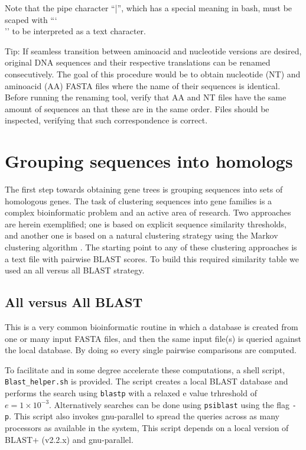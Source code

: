 \documentclass[10pt]{article}
\begin{document}
Note that the pipe character ``|'', which has a special meaning in
bash, must be scaped with ``\char`\\'' to be interpreted as a text character.

Tip: If seamless transition between aminoacid and nucleotide versions
are desired, original DNA sequences and their respective
translations can be renamed consecutively. The goal of this
procedure would be to obtain nucleotide (NT) and aminoacid (AA) FASTA
files where the name of their sequences is identical.  Before running
the renaming tool, verify that AA and NT files have the same amount of
sequences an that these are in the same order.  Files should be
inspected, verifying that such correspondence is correct.

\section{Grouping sequences into homologs} The first step towards
obtaining gene trees is grouping sequences into sets of homologous
genes. The task of clustering sequences into gene families is a
complex bioinformatic problem and an active area of research. Two
approaches are herein exemplified; one is based on explicit sequence
similarity thresholds, and another one is based on a natural
clustering strategy using the Markov clustering algorithm
\citep{vanDongen2000, Enright2002}. The starting point to any of these clustering approaches is
a text file with pairwise BLAST scores. To build this required
similarity table we used an all versus all BLAST strategy.

\subsection{All versus All BLAST} This is a very common bioinformatic
routine in which a database is created from one or many input FASTA
files, and then the same input file(s) is queried against the local
database. By doing so every single pairwise comparisons are computed.

To facilitate and in some degree accelerate these computations, a
shell script, \texttt{Blast\_helper.sh} is provided. The script
creates a local BLAST database and performs the search using
\texttt{blastp} with a relaxed e value trhreshold of $e = 1 \times
10^{-3}$. Alternatively searches can be done using \texttt{psiblast} using the flag \texttt{-p}. This script also invokes gnu-parallel to spread the queries
across as many processors as available in the system, This script
depends on a local version of BLAST+ (v2.2.x) and gnu-parallel.
\end{document}
